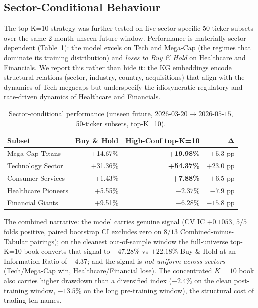 \documentclass[10pt,journal,compsoc]{IEEEtran}
\begin{document}
\subsection{Sector-Conditional Behaviour}

The top-K=10 strategy was further tested on five sector-specific 50-ticker subsets over the same 2-month unseen-future window. Performance is materially sector-dependent (Table~\ref{tab:bt_subsets}): the model excels on Tech and Mega-Cap (the regimes that dominate its training distribution) and \emph{loses to Buy \& Hold} on Healthcare and Financials. We report this rather than hide it: the KG embeddings encode structural relations (sector, industry, country, acquisitions) that align with the dynamics of Tech megacaps but underspecify the idiosyncratic regulatory and rate-driven dynamics of Healthcare and Financials.

\begin{table}[htbp]
\caption{Sector-conditional performance (unseen future, $2026\text{-}03\text{-}20 \to 2026\text{-}05\text{-}15$, 50-ticker subsets, top-K=10).}
\label{tab:bt_subsets}
\centering
\small
\begin{tabular}{lrrr}
\toprule
\textbf{Subset} & \textbf{Buy \& Hold} & \textbf{High-Conf top-K=10} & $\boldsymbol{\Delta}$ \\
\midrule
Mega-Cap Titans       & +14.67\% & \textbf{+19.98\%}  & $+5.3$ pp  \\
Technology Sector     & +31.36\% & \textbf{+54.37\%}  & $+23.0$ pp \\
Consumer Services     & +1.43\%  & \textbf{+7.88\%}   & $+6.5$ pp  \\
Healthcare Pioneers   & +5.55\%  & $-2.37\%$          & $-7.9$ pp  \\
Financial Giants      & +9.51\%  & $-6.28\%$          & $-15.8$ pp \\
\bottomrule
\end{tabular}
\end{table}

\noindent The combined narrative: the model carries genuine signal (CV IC $+0.1053$, $5/5$ folds positive, paired bootstrap CI excludes zero on $8/13$ Combined-minus-Tabular pairings); on the cleanest out-of-sample window the full-universe top-K=10 book converts that signal to $+47.28\%$ vs $+22.18\%$ Buy \& Hold at an Information Ratio of $+4.37$; and the signal is \emph{not uniform across sectors} (Tech/Mega-Cap win, Healthcare/Financial lose). The concentrated $K=10$ book also carries higher drawdown than a diversified index ($-2.4\%$ on the clean post-training window, $-13.5\%$ on the long pre-training window), the structural cost of trading ten names.
\end{document}
